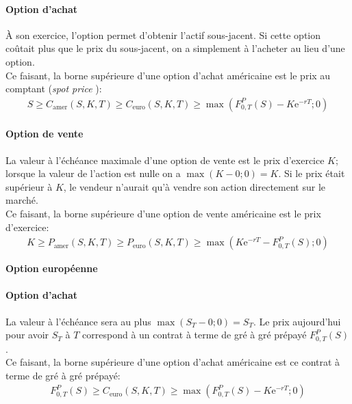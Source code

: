 \documentclass[10pt, french]{article}
\begin{document}
\begin{multicols*}{2}
\paragraph{Option d'achat}
À son exercice, l'option permet d'obtenir l'actif sous-jacent. Si cette option coûtait plus que le prix du sous-jacent, on a simplement à l'acheter au lieu d'une option.\\

Ce faisant, \textcolor{cobalt}{la borne supérieure d'une option d'achat américaine est le prix au comptant (\og \textit{spot price} \fg{})}:
\begin{align*}
	S	
	\geq	C_{\text{amer}}(S, K, T)
	\geq	C_{\text{euro}}(S, K, T)
	\geq	\max\left(F_{0, T}^{P}(S) - K\textrm{e}^{-rT}; 0\right)
\end{align*}

\paragraph{Option de vente}
La valeur à l'échéance maximale d'une option de vente est le prix d'exercice $K$; lorsque la valeur de l'action est nulle on a $\max(K - 0; 0) = K$. Si le prix était supérieur à $K$, le vendeur n'aurait qu'à vendre son action directement sur le marché. \\

Ce faisant, \textcolor{cobalt}{la borne supérieure d'une option de vente américaine est le prix d'exercice}:
\begin{align*}
	K	
	\geq	P_{\text{amer}}(S, K, T)
	\geq	P_{\text{euro}}(S, K, T)
	\geq	\max\left(K\textrm{e}^{-rT} - F_{0, T}^{P}(S); 0\right)	
\end{align*}

\begin{center}
	\textbf{Option européenne}
\end{center}

\paragraph{Option d'achat}
La valeur à l'échéance sera au plus $\max(S_{T} - 0; 0) = S_{T}$. Le prix aujourd'hui pour avoir $S_{T}$ à $T$ correspond à un contrat à terme de gré à gré prépayé $F_{0, T}^{P}(S)$.\\

Ce faisant, \textcolor{cobalt}{la borne supérieure d'une option d'achat américaine est ce contrat à terme de gré à gré prépayé}:
\begin{align*}
	F_{0, T}^{P}(S)
	\geq	C_{\text{euro}}(S, K, T)
	\geq	\max\left(F_{0, T}^{P}(S) - K\textrm{e}^{-rT}; 0\right)
\end{align*}


\end{multicols*}
\end{document}
